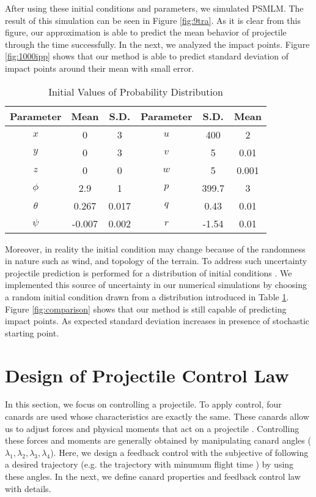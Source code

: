 \documentclass[letterpaper, 10 pt, conference]{ieeeconf}  %
\begin{document}
After using these initial conditions and parameters, we simulated PSMLM. The result of this simulation can be seen in Figure \ref{fig:9tra}. As it is clear from this figure, our approximation is able to predict the mean behavior of projectile through the time successfully. In the next, we analyzed the impact points. Figure \ref{fig:1000ipp} shows that our method is able to predict standard deviation of impact points around their mean with small error. 
\begin{table}[!h]
	\caption{\label{tab:initial}Initial Values of Probability Distribution}
	\centering
	\begin{tabular}{cccccc} 
		\hline
		Parameter  & Mean &S.D. &Parameter &S.D. & Mean \\
		\hline
		$x$& 0&3 & $u$ & 400 &2\\
		$y$& 0&3 &$v$ & 5 & 0.01\\
		$z$& 0&0 &$w$ & 5 & 0.001\\
		$\phi$& 2.9&1 &$p$ & 399.7 &3\\
		$\theta$& 0.267 &0.017 &$q$ &0.43 & 0.01\\
		$\psi$& -0.007 &0.002 &$r$ & -1.54 & 0.01\\
 \hline
	\end{tabular}
\end{table} 

Moreover, in reality the initial condition may change because of the randomness in nature such as wind, and topology of the terrain. To address such uncertainty projectile prediction is performed for a distribution of initial conditions \cite{rogers2015stochastic, ollerenshaw2008model, rogers2013design}. We implemented this source of uncertainty in our numerical simulations by choosing a random initial condition drawn from a distribution introduced in Table \ref{tab:initial}. Figure \ref{fig:comparison} shows that our method is still capable of predicting impact points. As expected standard deviation increases in presence of stochastic starting point.

\section{Design of Projectile Control Law}

In this section, we focus on controlling a projectile. To apply control, four canards are used whose characteristics are exactly the same. These canards allow us to adjust forces and physical moments that act on a projectile \cite{costel97pot}. Controlling these forces and moments are generally obtained by manipulating canard angles ($\lambda_1, \lambda_2, \lambda_3, \lambda_4$). Here, we design a feedback control with the subjective of following a desired trajectory (e.g. the trajectory with minumum flight time \cite{yanushevsky2007modern}) by using these angles. In the next, we define canard properties and feedback control law with details. 
\end{document}

